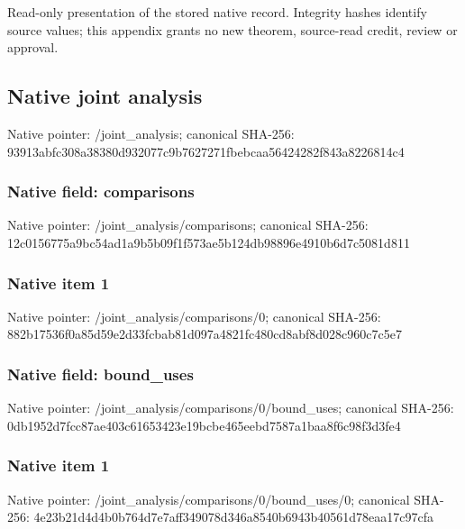 \documentclass[10pt,a4paper]{article}
\begin{document}
Read-only presentation of the stored native record. Integrity hashes identify source values; this appendix grants no new theorem, source-read credit, review or approval.



\subsection{Native joint analysis}


Native pointer: /joint\_analysis; canonical SHA-256: 93913abfc308a38380d93207\allowbreak{}7c9b7627271fbebcaa564242\allowbreak{}82f843a8226814c4



\subsubsection{Native field: comparisons}


Native pointer: /joint\_analysis/comparisons; canonical SHA-256: 12c0156775a9bc54ad1a9b5b\allowbreak{}09f1f573ae5b124db98896e4\allowbreak{}910b6d7c5081d811



\subsubsection{Native item 1}


Native pointer: /joint\_analysis/comparisons/0; canonical SHA-256: 882b17536f0a85d59e2d33fc\allowbreak{}bab81d097a4821fc480cd8ab\allowbreak{}f8d028c960c7c5e7



\subsubsection{Native field: bound\_uses}


Native pointer: /joint\_analysis/comparis\allowbreak{}ons/0/bound\_uses; canonical SHA-256: 0db1952d7fcc87ae403c6165\allowbreak{}3423e19bcbe465eebd7587a1\allowbreak{}baa8f6c98f3d3fe4



\subsubsection{Native item 1}


Native pointer: /joint\_analysis/comparis\allowbreak{}ons/0/bound\_uses/0; canonical SHA-256: 4e23b21d4d4b0b764d7e7aff\allowbreak{}349078d346a8540b6943b405\allowbreak{}61d78eaa17c97cfa
\end{document}

